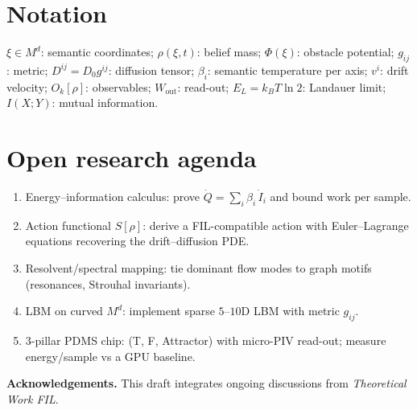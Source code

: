 \documentclass[11pt]{article}
\newcommand{\manifold}{M^d}
\begin{document}
\section{Notation}
$\xi\in \manifold$: semantic coordinates; $\rho(\xi,t)$: belief mass; $\Phi(\xi)$: obstacle potential; $g_{ij}$: metric; $D^{ij}=D_0 g^{ij}$: diffusion tensor; $\beta_i$: semantic temperature per axis; $v^i$: drift velocity; $O_k[\rho]$: observables; $W_{\text{out}}$: read-out; $E_L=k_BT\ln 2$: Landauer limit; $I(X;Y)$: mutual information.
\section{Open research agenda}
\begin{enumerate}[leftmargin=2em]
  \item Energy--information calculus: prove $\dot Q = \sum_i \beta_i\,\dot I_i$ and bound work per sample.
  \item Action functional $S[\rho]$: derive a FIL-compatible action with Euler--Lagrange equations recovering the drift--diffusion PDE.
  \item Resolvent/spectral mapping: tie dominant flow modes to graph motifs (resonances, Strouhal invariants).
  \item LBM on curved $\manifold$: implement sparse $5$--$10$D LBM with metric $g_{ij}$.
  \item 3-pillar PDMS chip: (T, F, Attractor) with micro-PIV read-out; measure energy/sample vs a GPU baseline.
\end{enumerate}
\bigskip
\noindent\textbf{Acknowledgements.} This draft integrates ongoing discussions from \emph{Theoretical Work FIL}.
\end{document}

